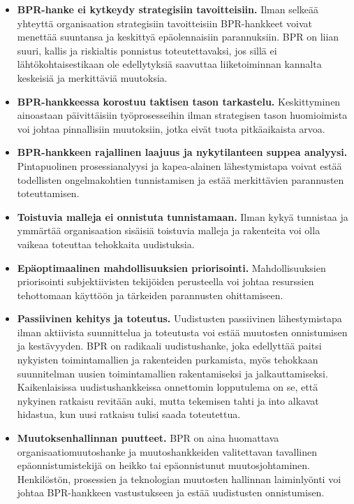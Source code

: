 \documentclass[
  finnish,
  letterpaper,
  DIV=11,
  numbers=noendperiod,
  oneside]{scrreprt}
\providecommand{\tightlist}{%
  \setlength{\itemsep}{0pt}\setlength{\parskip}{0pt}}
\begin{document}
\begin{itemize}
\tightlist
\item
  \textbf{BPR-hanke ei kytkeydy strategisiin tavoitteisiin.} Ilman
  selkeää yhteyttä organisaation strategisiin tavoitteisiin BPR-hankkeet
  voivat menettää suuntansa ja keskittyä epäolennaisiin parannuksiin.
  BPR on liian suuri, kallis ja riskialtis ponnistus toteutettavaksi,
  jos sillä ei lähtökohtaisestikaan ole edellytyksiä saavuttaa
  liiketoiminnan kannalta keskeisiä ja merkittäviä muutoksia.
\item
  \textbf{BPR-hankkeessa korostuu taktisen tason tarkastelu.}
  Keskittyminen ainoastaan päivittäisiin työprosesseihin ilman
  strategisen tason huomioimista voi johtaa pinnallisiin muutoksiin,
  jotka eivät tuota pitkäaikaista arvoa.
\item
  \textbf{BPR-hankkeen rajallinen laajuus ja nykytilanteen suppea
  analyysi.} Pintapuolinen prosessianalyysi ja kapea-alainen
  lähestymistapa voivat estää todellisten ongelmakohtien tunnistamisen
  ja estää merkittävien parannusten toteuttamisen.
\item
  \textbf{Toistuvia malleja ei onnistuta tunnistamaan.} Ilman kykyä
  tunnistaa ja ymmärtää organisaation sisäisiä toistuvia malleja ja
  rakenteita voi olla vaikeaa toteuttaa tehokkaita uudistuksia.
\item
  \textbf{Epäoptimaalinen mahdollisuuksien priorisointi.}
  Mahdollisuuksien priorisointi subjektiivisten tekijöiden perusteella
  voi johtaa resurssien tehottomaan käyttöön ja tärkeiden parannusten
  ohittamiseen.
\item
  \textbf{Passiivinen kehitys ja toteutus.} Uudistusten passiivinen
  lähestymistapa ilman aktiivista suunnittelua ja toteutusta voi estää
  muutosten onnistumisen ja kestävyyden. BPR on radikaali uudistushanke,
  joka edellyttää paitsi nykyisten toimintamallien ja rakenteiden
  purkamista, myös tehokkaan suunnitelman uusien toimintamallien
  rakentamiseksi ja jalkauttamiseksi. Kaikenlaisissa uudistushankkeissa
  onnettomin lopputulema on se, että nykyinen ratkaisu revitään auki,
  mutta tekemisen tahti ja into alkavat hidastua, kun uusi ratkaisu
  tulisi saada toteutettua.
\item
  \textbf{Muutoksenhallinnan puutteet.} BPR on aina huomattava
  organisaatiomuutoshanke ja muutoshankkeiden valitettavan tavallinen
  epäonnistumistekijä on heikko tai epäonnistunut muutosjohtaminen.
  Henkilöstön, prosessien ja teknologian muutosten hallinnan
  laiminlyönti voi johtaa BPR-hankkeen vastustukseen ja estää
  uudistusten onnistumisen.

\end{itemize}
\end{document}

